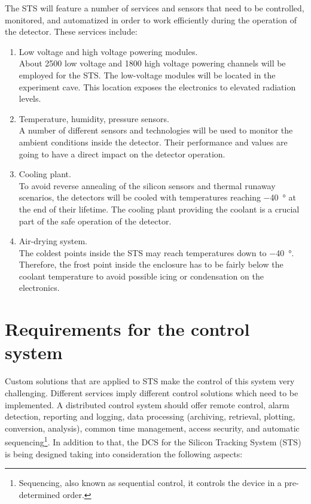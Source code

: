 The \gls{STS} will feature a number of services and sensors that need to be controlled, monitored, and automatized in order to work efficiently during the operation of the detector. These services include:
\begin{enumerate}
    \item Low voltage and high voltage powering modules.\\
    About 2500 low voltage and 1800 high voltage powering channels will be employed for the \gls{STS}. The low-voltage modules will be located in the experiment cave. This location exposes the electronics to elevated radiation levels. 
    \item Temperature, humidity, pressure sensors.\\
    A number of different sensors and technologies will be used to monitor the ambient conditions inside the detector. Their performance and values are going to have a direct impact on the detector operation.
    \item Cooling plant.\\
    To avoid reverse annealing of the silicon sensors and thermal runaway scenarios, the detectors will be cooled with temperatures reaching \SI{-40}{\degree} at the end of their lifetime. The cooling plant providing the coolant is a crucial part of the safe operation of the detector.
    \item Air-drying system.\\
    The coldest points inside the \gls{STS} may reach temperatures down to \SI{-40}{\degree}. Therefore, the frost point inside the enclosure has to be fairly below the coolant temperature to avoid possible icing or condensation on the electronics.
 \end{enumerate}



\section{Requirements for the control system}
\label{sys:req}
Custom solutions that are applied to \gls{STS} make the control of this system very challenging. Different services imply different control solutions which need to be implemented.
A distributed control system should offer remote control, alarm detection, reporting and logging, data processing (archiving, retrieval, plotting, conversion, analysis), common time management, access security, and automatic sequencing\footnote{Sequencing, also known as sequential control, it controls the device in a pre-determined order.}.
In addition to that, the \gls{DCS} for the Silicon Tracking System (\gls{STS}) is being designed taking into consideration the following aspects:

